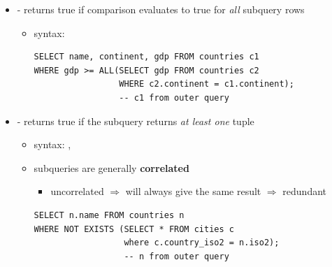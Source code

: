 \documentclass[10pt, landscape]{article}
\begin{document}
\begin{multicols}{3}
\begin{itemize}
    \item {} - returns true if comparison evaluates to true for \textit{all} subquery rows
      \begin{itemize}
        \item syntax: 
          \begin{lstlisting}[style=mySQL]
SELECT name, continent, gdp FROM countries c1
WHERE gdp >= ALL(SELECT gdp FROM countries c2
                 WHERE c2.continent = c1.continent); 
                 -- c1 from outer query
          \end{lstlisting}
      \end{itemize}

    \item {} - returns true if the subquery returns \textit{at least one} tuple
      \begin{itemize}
        \item syntax: , 
        \item {} subqueries are generally \textbf{correlated}
          \begin{itemize}
            \item uncorrelated $\Rightarrow$ will always give the same result $\Rightarrow$ redundant
          \end{itemize}
          \begin{lstlisting}[style=mySQL]
SELECT n.name FROM countries n
WHERE NOT EXISTS (SELECT * FROM cities c
                  where c.country_iso2 = n.iso2);
                  -- n from outer query
          \end{lstlisting}
      \end{itemize}
  \end{itemize}


\end{multicols}
\end{document}
